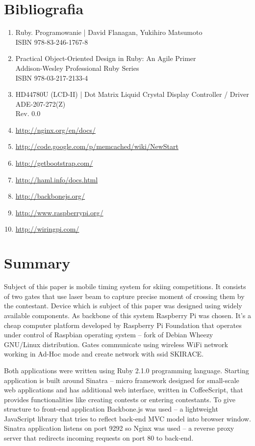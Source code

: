 \documentclass[11pt,a4paper, twoside]{article}
\begin{document}
\section{Bibliografia}
\begin{enumerate}
\item Ruby. Programowanie | David Flanagan, Yukihiro Matsumoto \\ ISBN 978-83-246-1767-8
\item Practical Object-Oriented Design in Ruby: An Agile Primer \\ Addison-Wesley Professional Ruby Series \\ ISBN 978-03-217-2133-4 
\item HD44780U (LCD-II) | Dot Matrix Liquid Crystal Display Controller / Driver \\ ADE-207-272(Z) \\ Rev. 0.0
\item \url{http://nginx.org/en/docs/}
\item \url{http://code.google.com/p/memcached/wiki/NewStart}
\item \url{http://getbootstrap.com/}
\item \url{http://haml.info/docs.html}
\item \url{http://backbonejs.org/}
\item \url{http://www.raspberrypi.org/}
\item \url{http://wiringpi.com/}
\end{enumerate}
\newpage
{}
\section{Summary}
	Subject of this paper is mobile timing system for skiing competitions. It consists of two gates that use laser beam to capture precise moment of crossing them by the contestant. Device which is subject of this paper was designed using widely available components. As backbone of this system  Raspberry Pi was chosen. It's a cheap computer platform developed by Raspberry Pi Foundation that operates under control of Raspbian operating system – fork of Debian Wheezy GNU/Linux distribution.  Gates communicate using wireless WiFi network working in Ad-Hoc mode and create network with ssid SKIRACE.
	
	Both applications were written using Ruby 2.1.0 programming language. Starting application is built around Sinatra – micro framework designed for small-scale web applications and has additional web interface, written in CoffeeScript, that provides functionalities like creating contests or entering contestants. To give structure to  front-end application Backbone.js was used – a lightweight JavaScript library that tries to reflect back-end  MVC model into browser window.  Sinatra application listens on port 9292 so Nginx was used – a reverse proxy server that redirects incoming requests on port 80 to back-end.
	
\end{document}
